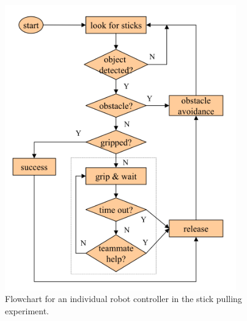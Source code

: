\documentclass[Main.tex]{subfiles}
\begin{document}
\begin{figure}[!tp]
\centering\includegraphics[width=10cm]{assets/stickControl.png}
\centering\caption{Flowchart for an individual robot controller in the stick pulling experiment.}\label{fig:stickchart}
\end{figure}
\end{document}
